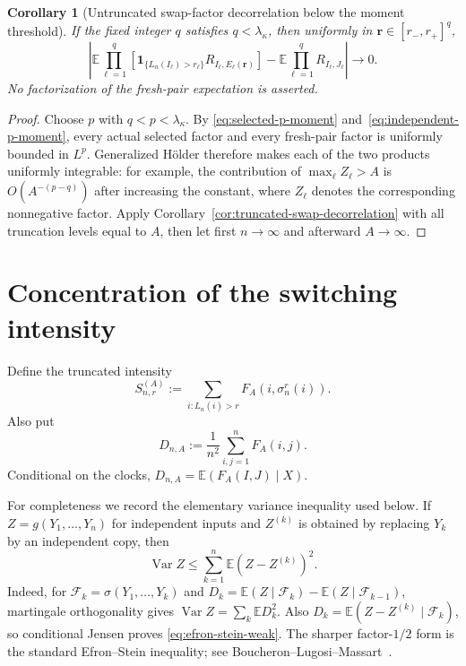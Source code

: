 \documentclass[11pt]{article}
\newcommand{\E}{\mathbb E}
\newcommand{\1}{\mathbf 1}
\newcommand{\Var}{\operatorname{Var}}
\newcommand{\cF}{\mathcal F}
\newtheorem{corollary}[theorem]{Corollary}
\theoremstyle{definition}
\theoremstyle{remark}
\begin{document}
\begin{corollary}[Untruncated swap-factor decorrelation below the moment threshold]
\label{cor:untruncated-swap-decorrelation}
If the fixed integer $q$ satisfies $q<\lambda_\kappa$, then uniformly in
$\mathbf r\in[r_-,r_+]^q$,
\begin{equation}\label{eq:untruncated-swap-decorrelation}
 \left|
 \E\prod_{\ell=1}^q
 \left[
  \1_{\{L_n(I_\ell)>r_\ell\}}
  R_{I_\ell,E_\ell(\mathbf r)}
 \right]
 -\E\prod_{\ell=1}^qR_{I_\ell,J_\ell}
 \right|
 \longrightarrow0.
\end{equation}
No factorization of the fresh-pair expectation is asserted.
\end{corollary}

\begin{proof}
Choose $p$ with $q<p<\lambda_\kappa$.  By
\eqref{eq:selected-p-moment} and~\eqref{eq:independent-p-moment}, every
actual selected factor and every fresh-pair factor is uniformly bounded
in $L^p$.  Generalized H\"older therefore makes each of the two products
uniformly integrable: for example, the contribution of
$\max_\ell Z_\ell>A$ is $O(A^{-(p-q)})$ after increasing the constant,
where $Z_\ell$ denotes the corresponding nonnegative factor.  Apply
Corollary~\ref{cor:truncated-swap-decorrelation} with all truncation
levels equal to $A$, then let first $n\to\infty$ and afterward
$A\to\infty$.
\end{proof}

\section{Concentration of the switching intensity}
\label{sec:switching-intensity}

Define the truncated intensity
\begin{equation}\label{eq:S-A-def}
  S_{n,r}^{(A)}
  :=\sum_{i:L_n(i)>r}F_A(i,\sigma_n^r(i)).
\end{equation}
Also put
\begin{equation}\label{eq:D-A-def}
  D_{n,A}:=\frac1{n^2}\sum_{i,j=1}^nF_A(i,j).
\end{equation}
Conditional on the clocks,
$D_{n,A}=\E(F_A(I,J)\mid X)$.

For completeness we record the elementary variance inequality used below.
If $Z=g(Y_1,\dots,Y_n)$ for independent inputs and $Z^{(k)}$ is obtained
by replacing $Y_k$ by an independent copy, then
\begin{equation}\label{eq:efron-stein-weak}
  \Var Z\leq\sum_{k=1}^n\E(Z-Z^{(k)})^2.
\end{equation}
Indeed, for $\cF_k=\sigma(Y_1,\dots,Y_k)$ and
$D_k=\E(Z\mid\cF_k)-\E(Z\mid\cF_{k-1})$, martingale
orthogonality gives $\Var Z=\sum_k\E D_k^2$.  Also
$D_k=\E(Z-Z^{(k)}\mid\cF_k)$, so conditional Jensen proves
\eqref{eq:efron-stein-weak}.  The sharper factor-$1/2$ form is the
standard Efron--Stein inequality; see
Boucheron--Lugosi--Massart~\cite[Theorem~3.1]{BLM2013}.
\end{document}
